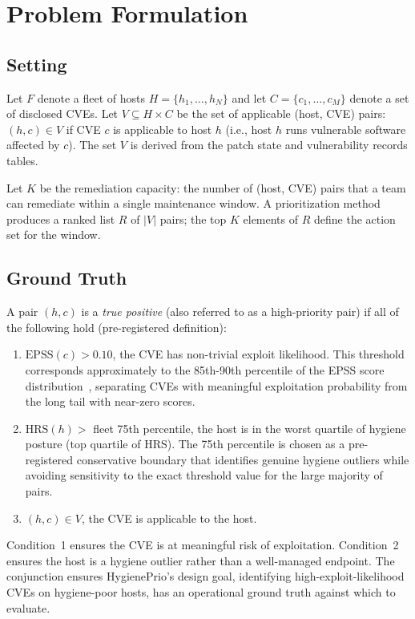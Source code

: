 \section{Problem Formulation}

\subsection{Setting}

Let $F$ denote a fleet of hosts $H = \{h_1, \ldots, h_N\}$ and let $C = \{c_1, \ldots, c_M\}$ denote a set of disclosed CVEs. Let $V \subseteq H \times C$ be the set of applicable (host, CVE) pairs: $(h, c) \in V$ if CVE $c$ is applicable to host $h$ (i.e., host $h$ runs vulnerable software affected by $c$). The set $V$ is derived from the patch state and vulnerability records tables.

Let $K$ be the remediation capacity: the number of (host, CVE) pairs that a team can remediate within a single maintenance window. A prioritization method produces a ranked list $R$ of $|V|$ pairs; the top $K$ elements of $R$ define the action set for the window.

\subsection{Ground Truth}

A pair $(h, c)$ is a \emph{true positive} (also referred to as a high-priority pair) if all of the following hold (pre-registered definition):

\begin{enumerate}
 \item $\mathrm{EPSS}(c) > 0.10$, the CVE has non-trivial exploit likelihood. This threshold corresponds approximately to the 85th-90th percentile of the EPSS score distribution~\cite{jacobs2021epss}, separating CVEs with meaningful exploitation probability from the long tail with near-zero scores.
 \item $\mathrm{HRS}(h) >$ fleet 75th percentile, the host is in the worst quartile of hygiene posture (top quartile of HRS). The 75th percentile is chosen as a pre-registered conservative boundary that identifies genuine hygiene outliers while avoiding sensitivity to the exact threshold value for the large majority of pairs.
 \item $(h, c) \in V$, the CVE is applicable to the host.
\end{enumerate}

Condition~1 ensures the CVE is at meaningful risk of exploitation. Condition~2 ensures the host is a hygiene outlier rather than a well-managed endpoint. The conjunction ensures HygienePrio's design goal, identifying high-exploit-likelihood CVEs on hygiene-poor hosts, has an operational ground truth against which to evaluate.

